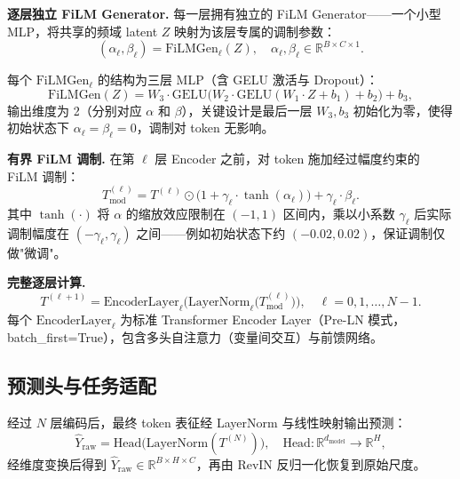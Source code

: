 \medskip\noindent\textbf{逐层独立 FiLM Generator.}
每一层拥有独立的 FiLM Generator——一个小型 MLP，将共享的频域 latent \(Z\) 映射为该层专属的调制参数：
\begin{equation}
  (\alpha_{\ell}, \beta_{\ell}) = \mathrm{FiLMGen}_{\ell}(Z), \quad
  \alpha_{\ell}, \beta_{\ell} \in \mathbb{R}^{B \times C \times 1}.
\end{equation}

每个 \(\mathrm{FiLMGen}_{\ell}\) 的结构为三层 MLP（含 GELU 激活与 Dropout）：
\begin{equation}
  \mathrm{FiLMGen}(Z) = W_3 \cdot \mathrm{GELU}\big(W_2 \cdot \mathrm{GELU}(W_1 \cdot Z + b_1) + b_2\big) + b_3,
\end{equation}
输出维度为 2（分别对应 \(\alpha\) 和 \(\beta\)），关键设计是最后一层 \(W_3, b_3\) 初始化为零，使得初始状态下 \(\alpha_{\ell} = \beta_{\ell} = 0\)，调制对 token 无影响。

\medskip\noindent\textbf{有界 FiLM 调制.}
在第 \(\ell\) 层 Encoder 之前，对 token 施加经过幅度约束的 FiLM 调制：
\begin{equation}
  T_{\text{mod}}^{(\ell)} = T^{(\ell)} \odot \big(1 + \gamma_{\ell} \cdot \tanh(\alpha_{\ell})\big) + \gamma_{\ell} \cdot \beta_{\ell}.
\end{equation}
其中 \(\tanh(\cdot)\) 将 \(\alpha\) 的缩放效应限制在 \((-1, 1)\) 区间内，乘以小系数 \(\gamma_{\ell}\) 后实际调制幅度在 \((-\gamma_{\ell}, \gamma_{\ell})\) 之间——例如初始状态下约 \((-0.02, 0.02)\)，保证调制仅做"微调"。

\medskip\noindent\textbf{完整逐层计算.}
\begin{equation}
  T^{(\ell+1)} = \mathrm{EncoderLayer}_{\ell}\Big(
    \mathrm{LayerNorm}_{\ell}\big(T_{\text{mod}}^{(\ell)}\big)
  \Big), \quad \ell = 0, 1, \dots, N-1.
\end{equation}
每个 \(\mathrm{EncoderLayer}_{\ell}\) 为标准 Transformer Encoder Layer（Pre-LN 模式，batch\_first=True），包含多头自注意力（变量间交互）与前馈网络。

\subsection{预测头与任务适配}
\label{subsec:head}

经过 \(N\) 层编码后，最终 token 表征经 LayerNorm 与线性映射输出预测：
\begin{equation}
  \hat{Y}_{\text{raw}} = \mathrm{Head}\big(\mathrm{LayerNorm}(T^{(N)})\big),
  \quad \mathrm{Head}: \mathbb{R}^{d_{\text{model}}} \to \mathbb{R}^{H},
\end{equation}
经维度变换后得到 \(\hat{Y}_{\text{raw}} \in \mathbb{R}^{B \times H \times C}\)，再由 RevIN 反归一化恢复到原始尺度。

